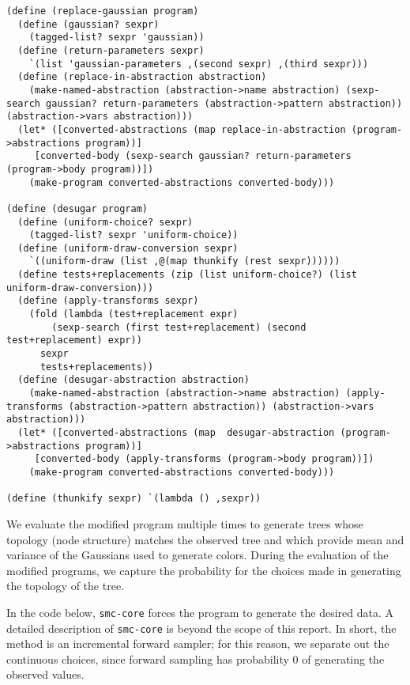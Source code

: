 \documentclass[a4paper,10pt]{article}
\begin{document}
\begin{lstlisting}[frame=trBL]
(define (replace-gaussian program)
  (define (gaussian? sexpr)
    (tagged-list? sexpr 'gaussian))
  (define (return-parameters sexpr)
    `(list 'gaussian-parameters ,(second sexpr) ,(third sexpr)))
  (define (replace-in-abstraction abstraction)
    (make-named-abstraction (abstraction->name abstraction) (sexp-search gaussian? return-parameters (abstraction->pattern abstraction)) (abstraction->vars abstraction)))
  (let* ([converted-abstractions (map replace-in-abstraction (program->abstractions program))]
	 [converted-body (sexp-search gaussian? return-parameters (program->body program))])
    (make-program converted-abstractions converted-body)))

(define (desugar program)
  (define (uniform-choice? sexpr)
    (tagged-list? sexpr 'uniform-choice))
  (define (uniform-draw-conversion sexpr)
    `((uniform-draw (list ,@(map thunkify (rest sexpr))))))
  (define tests+replacements (zip (list uniform-choice?) (list uniform-draw-conversion)))
  (define (apply-transforms sexpr)
    (fold (lambda (test+replacement expr)
	    (sexp-search (first test+replacement) (second test+replacement) expr))
	  sexpr
	  tests+replacements))
  (define (desugar-abstraction abstraction)
    (make-named-abstraction (abstraction->name abstraction) (apply-transforms (abstraction->pattern abstraction)) (abstraction->vars abstraction)))
  (let* ([converted-abstractions (map  desugar-abstraction (program->abstractions program))]
	 [converted-body (apply-transforms (program->body program))])
    (make-program converted-abstractions converted-body)))

(define (thunkify sexpr) `(lambda () ,sexpr))
\end{lstlisting}
We evaluate the modified program multiple times to generate trees whose topology (node structure) matches the observed tree and which provide mean and variance of the Gaussians used to generate colors.  During the evaluation of the modified programs, we capture the probability for the choices made in generating the topology of the tree.

In the code below, \texttt{smc-core} forces the program to generate the desired data.  A detailed description of \texttt{smc-core} is beyond the scope of this report. In short, the method is an incremental forward sampler; for this reason, we separate out the continuous choices, since forward sampling has probability $0$ of generating the observed values.
\end{document}
